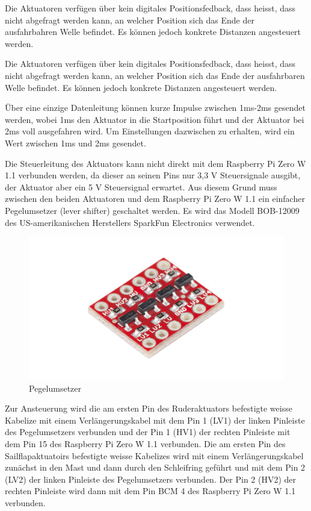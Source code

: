 Die Aktuatoren verfügen über kein digitales Positionsfedback, dass heisst, dass nicht abgefragt werden kann, an welcher Position sich das Ende der ausfahrbahren Welle befindet. Es können jedoch konkrete Distanzen angesteuert werden. 

Die Aktuatoren verfügen über kein digitales Positionsfedback, dass heisst, dass nicht abgefragt werden kann, an welcher Position sich das Ende der ausfahrbaren Welle befindet. Es können jedoch konkrete Distanzen angesteuert werden. 

Über eine einzige Datenleitung können kurze Impulse zwischen 1ms-2ms gesendet werden, wobei 1ms den Aktuator in die Startposition führt und der Aktuator bei 2ms voll ausgefahren wird. Um Einstellungen dazwischen zu erhalten, wird ein Wert zwischen 1ms und 2ms gesendet. 

Die Steuerleitung des Aktuators kann nicht direkt mit dem Raspberry Pi Zero W 1.1 verbunden werden, da dieser an seinen Pins nur 3,3 V Steuersignale ausgibt, der Aktuator aber ein 5 V Steuersignal erwartet. Aus diesem Grund muss zwischen den beiden Aktuatoren und dem Raspberry Pi Zero W 1.1 ein einfacher Pegelumsetzer (lever shifter) geschaltet werden. Es wird das Modell  BOB-12009 des US-amerikanischen Herstellers SparkFun Electronics verwendet.

\begin{figure} [H]
    \includegraphics[width=1\linewidth]{assets/Sparkfun-BOB-12009-30145425-01.jpg}
    \caption{Pegelumsetzer}
    \label{fig:enter-label}
\end{figure}
Zur Ansteuerung wird die am ersten Pin des Ruderaktuators befestigte weisse Kabelize mit einem Verlängerungskabel mit dem Pin 1 (LV1) der linken Pinleiste des Pegelumsetzers verbunden und der Pin 1 (HV1) der rechten Pinleiste mit dem Pin 15 des Raspberry Pi Zero W 1.1 verbunden. Die am ersten Pin  des Sailflapaktuatoirs befestigte weisse Kabelizes wird mit einem Verlängerungskabel zunächst in den Mast und dann durch den Schleifring geführt und mit dem Pin 2 (LV2) der linken Pinleiste des Pegelumsetzers verbunden. Der Pin 2 (HV2) der rechten Pinleiste wird dann mit dem Pin BCM 4 des Raspberry Pi Zero W 1.1 verbunden.

